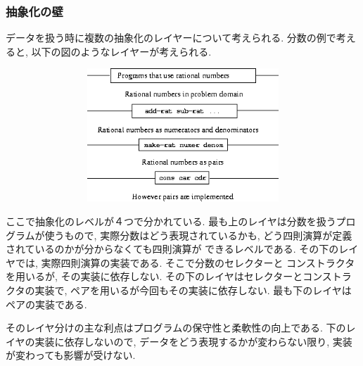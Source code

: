 \subsubsection{抽象化の壁}
データを扱う時に複数の抽象化のレイヤーについて考えられる.
分数の例で考えると, 以下の図のようなレイヤーが考えられる.

\begin{figure}[h]
  \centering
  \includegraphics[width=12cm,height=5cm]{imgs/abstraction-barrier.png}
\end{figure}

ここで抽象化のレベルが４つで分かれている. 最も上のレイヤは分数を扱うプログラムが使うもので,
実際分数はどう表現されているかも, どう四則演算が定義されているのかが分からなくても四則演算が
できるレベルである. その下のレイヤでは, 実際四則演算の実装である. そこで分数のセレクターと
コンストラクタを用いるが, その実装に依存しない. その下のレイヤはセレクターとコンストラクタの実装で,
ペアを用いるが今回もその実装に依存しない. 最も下のレイヤはペアの実装である.

そのレイヤ分けの主な利点はプログラムの保守性と柔軟性の向上である.
下のレイヤの実装に依存しないので, データをどう表現するかが変わらない限り,
実装が変わっても影響が受けない.
